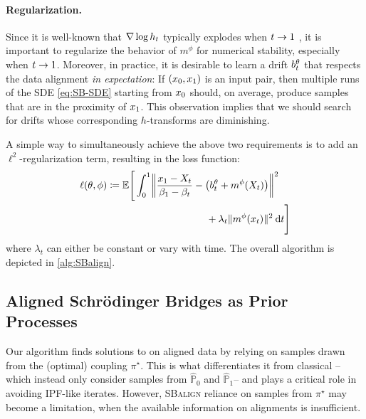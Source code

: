 \paragraph{Regularization.}
Since it is well-known that $\nabla \log h_t$ typically explodes when $t\to 1$ \citep{liu2023learning}, it is important to regularize the behavior of $m^{\phi}$ for numerical stability, especially when $t\to 1$. Moreover, in practice, it is desirable to learn a drift $b_t^\theta$ that respects the data alignment \emph{in expectation}: If $(x_0,x_1)$ is an input pair, then multiple runs of the \acrshort{SDE} \eqref{eq:SB-SDE} starting from $x_0$ should, on average, produce samples that are in the proximity of $x_1$. This observation implies that we should search for drifts whose corresponding $h$-transforms are diminishing.

A simple way to simultaneously achieve the above two requirements is to add an $\ell^2$-regularization term, resulting in the loss function:
\begin{align}
\label{eq:loss_final}
\Loss(\theta,\phi) &\defeq \mathbb{E} \Bigg[\int_0^1 \norm*{\frac{\x_1-X_t}{\cvolat[\horizon]-\cvolat[\ctime]}- \left(\fdrift^\theta + m^{\phi}(X_t)\right)}^2
\\ &\hspace{35mm}+ \lambda_t \norm{m^{\phi}(\x_t)}^2 \dt \Bigg]
\nonumber
\end{align}where $\lambda_t$ can either be constant or vary with time. The overall algorithm is depicted in \cref{alg:SBalign}.


\subsection{Aligned Schr{\"o}dinger Bridges as Prior Processes}
\label{subsec:prior_drift}

Our algorithm finds solutions to  on aligned data by relying on samples drawn from the (optimal) coupling $\pi^\star$. This is what differentiates it from classical  --which instead only consider samples from $\hat{\mathbb{P}}_0$ and $\hat{\mathbb{P}}_1$-- and plays a critical role in avoiding \acrshort{IPF}-like iterates. However, \textsc{SBalign} reliance on samples from $\pi^\star$ may become a limitation, when the available information on alignments is insufficient. 

